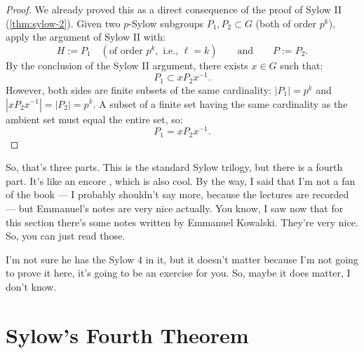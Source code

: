 \begin{proofWrapper}
\begin{content}
\begin{proof}
We already proved this as a direct consequence of the proof of Sylow II (\cref{thm:sylow-2}). Given two $p$-Sylow subgroups $P_1, P_2 \subset G$ (both of order $p^k$), apply the argument of Sylow II with:
\[
H := P_1 \quad (\text{of order } p^k, \text{ i.e., } \ell = k) \qquad \text{and} \qquad P := P_2.
\]
By the conclusion of the Sylow II argument, there exists $x \in G$ such that:
\[
P_1 \subset x P_2 x^{-1}.
\]
However, both sides are finite subsets of the same cardinality: $|P_1| = p^k$ and $|x P_2 x^{-1}| = |P_2| = p^k$. A subset of a finite set having the same cardinality as the ambient set must equal the entire set, so:
\[
P_1 = x P_2 x^{-1}.
\]
\end{proof}
\end{content}

\end{proofWrapper}

\begin{hidden}
\end{hidden}

\begin{speech}[00:39:23 - 00:40:20]
So, that's three parts. This is the standard Sylow trilogy, but there is a fourth part. It's like an encore , which is also cool. By the way, I said that I'm not a fan of the book --- I probably shouldn't say more, because the lectures are recorded --- but Emmanuel's notes are very nice actually. You know, I saw now that for this section there's some notes written by Emmanuel Kowalski. They're very nice. So, you can just read those.

I'm not sure he has the Sylow $4$ in it, but it doesn't matter because I'm not going to prove it here, it's going to be an exercise for you. So, maybe it does matter, I don't know.
\end{speech}

\section{Sylow's Fourth Theorem}

